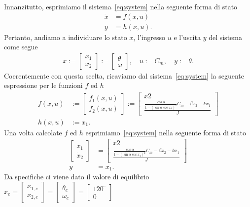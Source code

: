 \documentclass[a4paper, 11pt]{article}
\begin{document}
Innanzitutto, esprimiamo il sistema~\eqref{eq:system} nella seguente forma di stato
%
\begin{subequations}
\begin{align}\label{eq:state_form}
	\dot{x} &= f(x,u)
	\\
	y &= h(x,u).
\end{align}
\end{subequations}
%
Pertanto, andiamo a individuare lo stato $x$, l'ingresso $u$ e l'uscita $y$ del sistema come segue 
%
\begin{align*}
x := \begin{bmatrix}
	    x_1\\
            x_2     
	\end{bmatrix} := \begin{bmatrix}
	    \theta\\
        \omega     
	\end{bmatrix}, \quad u := C_m, \quad y := \theta.
\end{align*}
%
Coerentemente con questa scelta, ricaviamo dal sistema~\eqref{eq:system} la seguente espressione per le funzioni $f$ ed $h$
%
\begin{align*}
	f(x,u) &:= \begin{bmatrix}
	    f_1(x,u)\\
            f_2(x,u)     
	\end{bmatrix} := \begin{bmatrix}
	    x2\\
            \frac{\frac{\cos{\alpha}}{1-(\sin{\alpha}\cos{x_1})^2}C_m - \beta x_2 - kx_1}{J}     
	\end{bmatrix}
	\\
	h(x,u) &:= x_1.
\end{align*}
%
Una volta calcolate $f$ ed $h$ esprimiamo~\eqref{eq:system} nella seguente forma di stato
%
\begin{subequations}\label{eq:our_system_state_form}
\begin{align}
	\begin{bmatrix}
		\dot{x}_1
		\\
		\dot{x}_2
	\end{bmatrix} &= \begin{bmatrix}
	    x2\\
            \frac{\frac{\cos{\alpha}}{1-(\sin{\alpha}\cos{x_1})^2}C_m - \beta x_2 - kx_1}{J}     \end{bmatrix} \label{eq:state_form_1}
	\\
	y &= x_1.
\end{align}
\end{subequations}
%
Da specifiche ci viene dato il valore di equilibrio $ x_e = \begin{bmatrix}
		x_{1,e}
		\\
		x_{2,e}
	\end{bmatrix} = 
    \begin{bmatrix}
		\theta_e
		\\
		\omega_e
	\end{bmatrix} =
 \begin{bmatrix}
		120^\circ
		\\
		0
	\end{bmatrix}$
\end{document}
